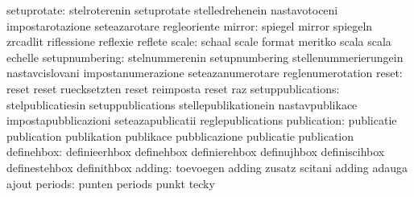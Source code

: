                      setuprotate: stelroterenin                    setuprotate
                                  stelledrehenein                  nastavotoceni
                                  impostarotazione                 seteazarotare
                                  regleoriente
                          mirror: spiegel                          mirror
                                  spiegeln                         zrcadlit
                                  riflessione                      reflexie
                                  reflete
                           scale: schaal                           scale
                                  format                           meritko
                                  scala                            scala
                                  echelle
                  setupnumbering: stelnummerenin                   setupnumbering
                                  stellenummerierungein            nastavcislovani
                                  impostanumerazione               seteazanumerotare
                                  reglenumerotation
                           reset: reset                            reset
                                  ruecksetzten                     reset
                                  reimposta                        reset
                                  raz
               setuppublications: stelpublicatiesin                setuppublications
                                  stellepublikationein             nastavpublikace
                                  impostapubblicazioni             seteazapublicatii
                                  reglepublications
                     publication: publicatie                       publication
                                  publikation                      publikace
                                  pubblicazione                    publicatie
                                  publication
                      definehbox: definieerhbox                    definehbox
                                  definierehbox                    definujhbox
                                  definiscihbox                    definestehbox
                                  definithbox
                          adding: toevoegen                        adding
                                  zusatz                           scitani
                                  adding                           adauga
                                  ajout
                         periods: punten                           periods
                                  punkt                            tecky
